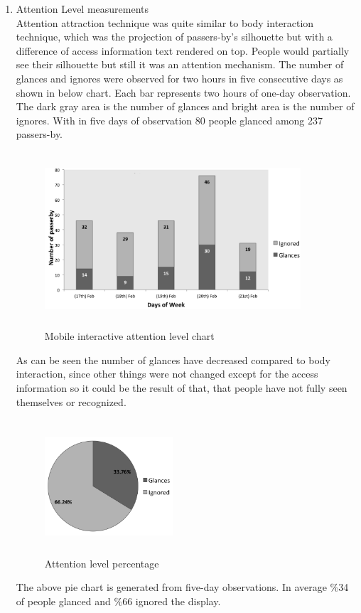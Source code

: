 \begin{enumerate}

\item Attention Level measurements \\
Attention attraction technique was quite similar to body interaction technique, which was the projection of passers-by's silhouette but with a difference of access information text rendered on top. People would partially see their silhouette but still it was an attention mechanism.
The number of glances and ignores were observed for two hours in five consecutive days as shown in below chart. Each bar represents two hours of one-day observation. The dark gray area is the number of glances and bright area is the number of ignores. With in five days of observation 80 people glanced among 237 passers-by. 


\begin{figure}[H]
    \centering
    \includegraphics[width=0.9\textwidth,height=6.5cm]{Figures/8/mobile_inter_findings/mobile_Inter_chart}%
    \caption{Mobile interactive attention level chart}%
    \label{fig:mobileattentionlevelchart}%
\end{figure}

As can be seen the number of glances have decreased compared to body interaction, since other things were not changed except for the access information so it could be the result of that, that people have not fully seen themselves or recognized. 

\begin{figure}[H]
    \centering
    \includegraphics[width=0.45\textwidth,height=5cm]{Figures/8/mobile_inter_findings/mobile_inter_percentage}
    \caption{Attention level percentage}%
    \label{fig:bodyattentionlevelpercentage}%
\end{figure}
The above pie chart is generated from five-day observations. In average \%34 of people glanced and \%66 ignored the display. 



\end{enumerate}
